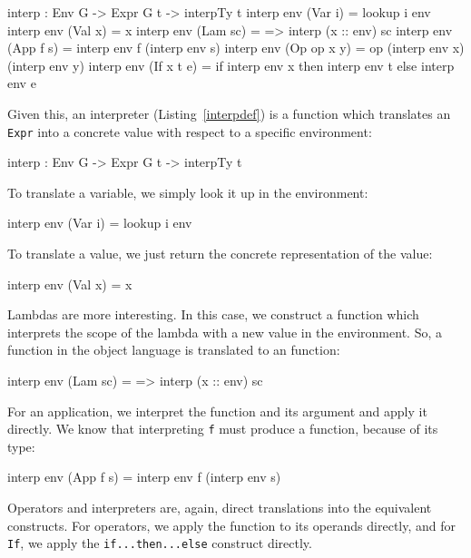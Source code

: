 \begin{code}[caption={Intepreter definition},label=interpdef]
interp : Env G -> Expr G t -> interpTy t
interp env (Var i)     = lookup i env
interp env (Val x)     = x
interp env (Lam sc)    = \x => interp (x :: env) sc
interp env (App f s)   = interp env f (interp env s)
interp env (Op op x y) = op (interp env x) (interp env y)
interp env (If x t e)  = if interp env x then interp env t 
                                         else interp env e
\end{code}

\noindent
Given this, an interpreter (Listing~\ref{interpdef}) is a function which translates an \texttt{Expr} into a concrete \Idris{} value with respect to a specific environment:

\begin{code}
interp : Env G -> Expr G t -> interpTy t
\end{code}

\noindent
To translate a variable, we simply look it up in the environment:

\begin{code}
interp env (Var i) = lookup i env
\end{code}

\noindent
To translate a value, we just return the concrete representation of the value:

\begin{code}
interp env (Val x) = x
\end{code}

\noindent
Lambdas are more interesting.
In this case, we construct a function which interprets the scope of the lambda with a new value in the environment.
So, a function in the object language is translated to an \Idris{} function:

\begin{code}
interp env (Lam sc) = \x => interp (x :: env) sc
\end{code}

\noindent
For an application, we interpret the function and its argument and apply it directly.
We know that interpreting \texttt{f} must produce a function, because of its type:

\begin{code}
interp env (App f s) = interp env f (interp env s)
\end{code}

\noindent
Operators and interpreters are, again, direct translations into the equivalent \Idris{} constructs.
For operators, we apply the function to its operands directly, and for \texttt{If}, we apply the \Idris{} \texttt{if...then...else} construct directly.

